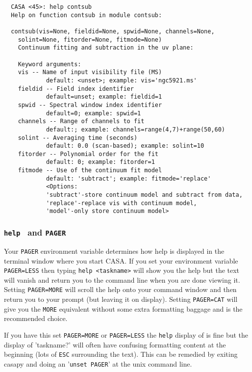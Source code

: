 \small
\begin{verbatim}
  CASA <45>: help contsub
  Help on function contsub in module contsub:

  contsub(vis=None, fieldid=None, spwid=None, channels=None,
    solint=None, fitorder=None, fitmode=None) 
    Continuum fitting and subtraction in the uv plane:

    Keyword arguments:
    vis -- Name of input visibility file (MS)
            default: <unset>; example: vis='ngc5921.ms'
    fieldid -- Field index identifier
            default=unset; example: fieldid=1
    spwid -- Spectral window index identifier
            default=0; example: spwid=1
    channels -- Range of channels to fit
            default:; example: channels=range(4,7)+range(50,60)
    solint -- Averaging time (seconds)
            default: 0.0 (scan-based); example: solint=10
    fitorder -- Polynomial order for the fit
            default: 0; example: fitorder=1
    fitmode -- Use of the continuum fit model
            default: 'subtract'; example: fitmode='replace'
            <Options:
            'subtract'-store continuum model and subtract from data,
            'replace'-replace vis with continuum model,
            'model'-only store continuum model>
\end{verbatim}
\normalsize

\subsubsection{{\tt help } and {\tt PAGER}}
\label{section:intro.basics.help.page}

Your {\tt PAGER} environment variable determines how help is
displayed in the terminal window where you start CASA. If you set
your environment variable {\tt PAGER=LESS} then typing 
{\tt help <taskname>} will show
you the help but the text will vanish and return you to the command
line when you are done viewing it. Setting {\tt PAGER=MORE} will scroll the
help onto your command window and then return you to your prompt (but
leaving it on display). Setting {\tt PAGER=CAT} will give you the 
{\tt MORE} equivalent without some extra formatting baggage and is the
recommended choice.   

If you have this set {\tt PAGER=MORE}
or {\tt PAGER=LESS} the {\tt help} display of is fine but the display of
'taskname?' will often have confusing formatting content at the
beginning (lots of {\tt ESC} surrounding the text). This can be remedied
by exiting casapy and doing an '{\tt unset PAGER}' at the unix command line.

